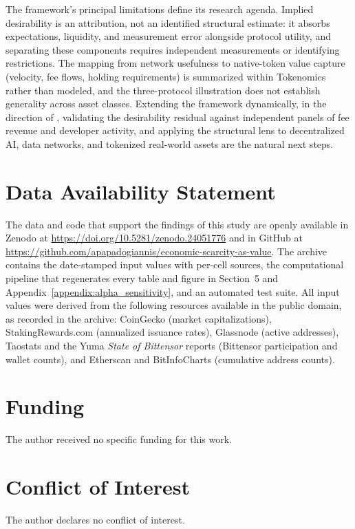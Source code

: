 \documentclass[12pt]{article}
\begin{document}
The framework's principal limitations define its research agenda. Implied desirability is an attribution, not an identified structural estimate: it absorbs expectations, liquidity, and measurement error alongside protocol utility, and separating these components requires independent measurements or identifying restrictions. The mapping from network usefulness to native-token value capture (velocity, fee flows, holding requirements) is summarized within Tokenomics rather than modeled, and the three-protocol illustration does not establish generality across asset classes. Extending the framework dynamically, in the direction of \citet{cong2021tokenomics}, validating the desirability residual against independent panels of fee revenue and developer activity, and applying the structural lens to decentralized AI, data networks, and tokenized real-world assets are the natural next steps.



\section*{Data Availability Statement}
The data and code that support the findings of this study are openly available in Zenodo at \url{https://doi.org/10.5281/zenodo.24051776} and in GitHub at \url{https://github.com/apapadogiannis/economic-scarcity-as-value}. The archive contains the date-stamped input values with per-cell sources, the computational pipeline that regenerates every table and figure in Section~5 and Appendix~\ref{appendix:alpha_sensitivity}, and an automated test suite. All input values were derived from the following resources available in the public domain, as recorded in the archive: CoinGecko (market capitalizations), StakingRewards.com (annualized issuance rates), Glassnode (active addresses), Taostats and the Yuma \emph{State of Bittensor} reports (Bittensor participation and wallet counts), and Etherscan and BitInfoCharts (cumulative address counts).

\section*{Funding}
The author received no specific funding for this work.

\section*{Conflict of Interest}
The author declares no conflict of interest.
\end{document}
